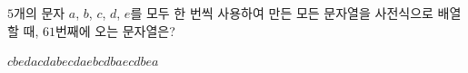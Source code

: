 $5$개의 문자 $a$, $b$, $c$, $d$, $e$를 모두 한 번씩 사용하여 만든 모든 문자열을 사전식으로 배열할 때, $61$번째에 오는 문자열은?
\begin{choices32}{$cbeda$}{$cdabe$}{$cdaeb$}{$cdbae$}{$cdbea$}\end{choices32}
